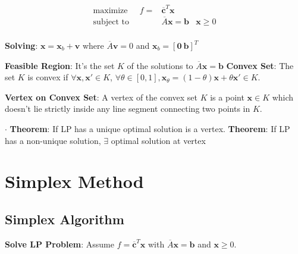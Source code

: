 \documentclass[9pt]{article}
\begin{document}
\begin{multicols}{2}
    \[
    \begin{aligned}
        \text{maximize} \quad \ \ f = & \overline{\mathbf{c}}^T\mathbf{x} & \\
        \text{subject to} \quad \qquad & \overline{A}\mathbf{x} = \mathbf{b} & \mathbf{x} \geq 0 \\
    \end{aligned}
    \]

    \vspace{-20pt}
    \textbf{Solving}: $\mathbf{x}=\mathbf{x}_b+\mathbf{v}$ where $\overline{A}\mathbf{v}=0$ and $\mathbf{x}_b=[\mathbf{0} \ \mathbf{b}]^T$

\end{multicols}

\vspace{-15pt}
\textbf{Feasible Region}: {\small It's the set $K$ of the solutions to $\overline{A}\mathbf{x}=\mathbf{b}$} \quad \textbf{Convex Set}: {\small The set $K$ is convex if $\forall \mathbf{x},\mathbf{x'}\in K$, $\forall\theta\in[0,1],\mathbf{x}_{\theta}=(1-\theta)\mathbf{x}+\theta\mathbf{x'}\in K$.}

\textbf{Vertex on Convex Set}: {\footnotesize A vertex of the convex set $K$ is a point $\mathbf{x}\in K$ which doesn't lie strictly inside any line segment connecting two points in $K$.}

$\cdot$ \textbf{Theorem}: {\small If LP has a unique optimal solution is a vertex.} \quad \quad \textbf{Theorem}: {\small If LP has a non-unique solution, $\exists$ optimal solution at vertex}


\section{Simplex Method} %

\subsection{Simplex Algorithm}

\textbf{Solve LP Problem}: Assume $f=\overline{\mathbf{c}}^T\mathbf{x}$ with $\overline{A}\mathbf{x}=\mathbf{b}$ and $\mathbf{x}\geq0$.
\end{document}
